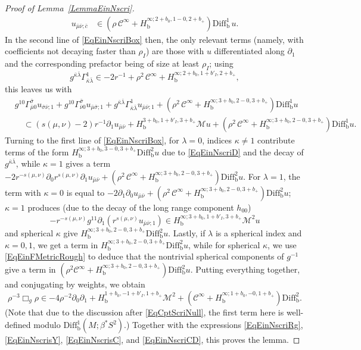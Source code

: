 \documentclass[reqno,11pt,letterpaper]{amsart}
\numberwithin{equation}{section}
\numberwithin{figure}{section}
\theoremstyle{definition}
\theoremstyle{remark}
\newcommand{\mc}{\mathcal}
\newcommand{\cC}{\mc C}
\newcommand{\cM}{\mc M}
\newcommand{\pa}{\partial}
\newcommand{\bop}{{\mathrm{b}}}
\newcommand{\Diff}{\mathrm{Diff}}
\newcommand{\Diffb}{\Diff_\bop}
\newcommand{\CI}{\cC^\infty}
\newcommand{\Hb}{H_{\bop}}
\newcommand{\usref}[1]{{\upshape\ref{#1}}}
\begin{document}
\begin{proof}[Proof of Lemma~\usref{LemmaEinNscri}]
\begin{equation}
\begin{split}
    u_{\bar\mu\bar\nu;\bar c} &\in (\rho\,\CI+\Hb^{\infty;2+b_0,1-0,2+b_+})\Diffb^1\,u.
  \end{split}
  \end{equation}
  In the second line of \eqref{EqEinNscriBox} then, the only relevant terms (namely, with coefficients not decaying faster than $\rho_I$) are those with $u$ differentiated along $\pa_1$ and the corresponding prefactor being of size at least $\rho_I$; using
  \begin{equation}
  \label{EqEinNscriContractedGamma}
    g^{\bar\kappa\bar\lambda}\Gamma^1_{\bar\kappa\bar\lambda}\in -2 r^{-1}+\rho^2\,\CI+\Hb^{\infty;2+b_0,1+b'_I,2+b_+},
  \end{equation}
  this leaves us with
  \begin{align*}
    &g^{1 0}\Gamma_{\bar\mu 0}^{\bar\sigma}u_{\bar\sigma\bar\nu;1} + g^{1 0}\Gamma_{\bar\nu 0}^{\bar\sigma}u_{\bar\mu\bar\sigma;1} + g^{\bar\kappa\bar\lambda}\Gamma^1_{\bar\kappa\bar\lambda}u_{\bar\mu\bar\nu;1} + (\rho^2\,\CI+\Hb^{\infty;3+b_0,2-0,3+b_+})\Diffb^1 u \\
    &\quad\subset (s(\mu,\nu)-2)r^{-1}\pa_1 u_{\bar\mu\bar\nu} + \Hb^{3+b_0,1+b'_I,3+b_+}\cM u + (\rho^2\,\CI+\Hb^{\infty;3+b_0,2-0,3+b_+})\Diffb^1 u.
  \end{align*}
  Turning to the first line of \eqref{EqEinNscriBox}, for $\lambda=0$, indices $\kappa\neq 1$ contribute terms of the form $\Hb^{\infty;3+b_0,3-0,3+b_+}\Diffb^2 u$ due to \eqref{EqEinNscriD} and the decay of $g^{\bar\kappa\bar\lambda}$, while $\kappa=1$ gives a term $-2 r^{-s(\mu,\nu)}\pa_0 r^{s(\mu,\nu)}\pa_1 u_{\bar\mu\bar\nu}+(\rho^2\,\CI+\Hb^{\infty;3+b_0,2-0,3+b_+})\Diffb^2 u$. For $\lambda=1$, the term with $\kappa=0$ is equal to $-2\pa_1\pa_0 u_{\bar\mu\bar\nu}+(\rho^2\,\CI+\Hb^{\infty;3+b_0,2-0,3+b_+})\Diffb^2 u$; $\kappa=1$ produces (due to the decay of the long range component $h_{0 0}$)
  \[
    -r^{-s(\mu,\nu)}g^{1 1}\pa_1(r^{s(\mu,\nu)}u_{\bar\mu\bar\nu;1}) \in \Hb^{\infty;3+b_0,1+b'_I,3+b_+}\cM^2 u
  \]
  and spherical $\kappa$ give $\Hb^{\infty;3+b_0,2-0,3+b_+}\Diffb^2 u$. Lastly, if $\lambda$ is a spherical index and $\kappa=0,1$, we get a term in $\Hb^{\infty;3+b_0,2-0,3+b_+}\Diffb^2 u$, while for spherical $\kappa$, we use \eqref{EqEinFMetricRough} to deduce that the nontrivial spherical components of $g^{-1}$ give a term in $(\rho^2\CI+\Hb^{\infty;3+b_0,2-0,3+b_+})\Diffb^2 u$. Putting everything together, and conjugating by weights, we obtain
  \begin{equation}
  \label{EqEinNscriBoxForm}
    \rho^{-3}\Box_g \rho \in -4\rho^{-2}\pa_0\pa_1 + \Hb^{1+b_0,-1+b'_I,1+b_+}\cM^2 + (\CI+\Hb^{\infty;1+b_0,-0,1+b_+})\Diffb^2.
  \end{equation}
  (Note that due to the discussion after \eqref{EqCptScriNull}, the first term here is well-defined modulo $\Diffb^1(M;\beta^*S^2)$.) Together with the expressions \eqref{EqEinNscriRg}, \eqref{EqEinNscrisY}, \eqref{EqEinNscrisC}, and \eqref{EqEinNscriCD}, this proves the lemma.
\end{proof}
\end{document}

